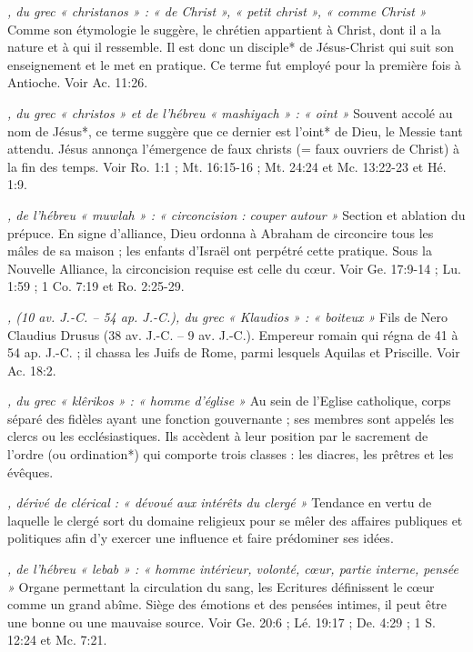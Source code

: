\begin{multicols}{2}
\textit{, du grec « christanos » : « de Christ », « petit christ », « comme Christ »}\newline
Comme son étymologie le suggère, le chrétien appartient à Christ, dont il a la nature et à qui il ressemble. Il est donc un disciple* de Jésus-Christ qui suit son enseignement et le met en pratique. Ce terme fut employé pour la première fois à Antioche. Voir Ac. 11:26.

\textit{, du grec « christos » et de l'hébreu « mashiyach » : « oint »}\newline
Souvent accolé au nom de Jésus*, ce terme suggère que ce dernier est l'oint* de Dieu, le Messie tant attendu. Jésus annonça l'émergence de faux christs (= faux ouvriers de Christ) à la fin des temps. Voir Ro. 1:1 ; Mt. 16:15-16 ; Mt. 24:24 et Mc. 13:22-23 et Hé. 1:9.

\textit{, de l'hébreu « muwlah » : « circoncision : couper autour »}\newline
Section et ablation du prépuce. En signe d'alliance, Dieu ordonna à Abraham de circoncire tous les mâles de sa maison ; les enfants d'Israël ont perpétré cette pratique. Sous la Nouvelle Alliance, la circoncision requise est celle du cœur. Voir Ge. 17:9-14 ; Lu. 1:59 ; 1 Co. 7:19 et Ro. 2:25-29.

\textit{, (10 av. J.-C. – 54 ap. J.-C.), du grec « Klaudios » : « boiteux »}\newline
Fils de Nero Claudius Drusus (38 av. J.-C. – 9 av. J.-C.). Empereur romain qui régna de 41 à 54 ap. J.-C. ; il chassa les Juifs de Rome, parmi lesquels Aquilas et Priscille. Voir Ac. 18:2.

\textit{, du grec « klêrikos » : « homme d'église »}\newline
Au sein de l'Eglise catholique, corps séparé des fidèles ayant une fonction gouvernante ; ses membres sont appelés les clercs ou les ecclésiastiques. Ils accèdent à leur position par le sacrement de l'ordre (ou ordination*) qui comporte trois classes : les diacres, les prêtres et les évêques.

\textit{, dérivé de clérical : « dévoué aux intérêts du clergé »}\newline
Tendance en vertu de laquelle le clergé sort du domaine religieux pour se mêler des affaires publiques et politiques afin d'y exercer une influence et faire prédominer ses idées.

\textit{, de l'hébreu « lebab » : « homme intérieur, volonté, cœur, partie interne, pensée »}\newline
Organe permettant la circulation du sang, les Ecritures définissent le cœur comme un grand abîme. Siège des émotions et des pensées intimes, il peut être une bonne ou une mauvaise source. Voir Ge. 20:6 ; Lé. 19:17 ; De. 4:29 ; 1 S. 12:24 et Mc. 7:21.


\end{multicols}
